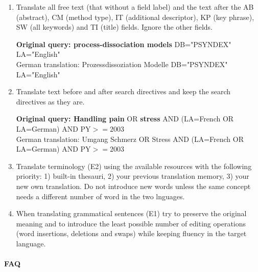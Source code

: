 \documentclass[a4paper,10pt]{article}
\newcommand{\ex}[1]{\begin{tcolorbox}[]{#1}\end{tcolorbox}}
\begin{document}
\begin{enumerate}

 \item Translate all free text (that without a field label) and the text after the AB (abstract), CM (method type), IT (additional descriptor), KP (key phrase), SW (all keywords) and TI (title) fields. Ignore the other fields.
 \ex{{\bf Original query: process-dissociation models} DB="PSYNDEX" LA="English" \\
     German translation: Prozessdissoziation Modelle DB="PSYNDEX" LA="English"}

 \item Translate text before and after search directives and keep the search directives as they are.
 \ex{{\bf Original query: Handling pain} OR {\bf stress} AND (LA=French OR LA=German) AND PY$>=2003$ \\
  German translation: Umgang Schmerz OR  Stress AND  (LA=French OR LA=German) AND PY$>=2003$}
  
 \item Translate terminology (E2) using the available resources with the following priority: 1) built-in thesauri, 2) your previous translation memory, 3) your new own translation. Do not introduce new words unless the same concept needs a different number of word in the two lnguages.

 \item When translating grammatical sentences (E1) try to preserve the original meaning and to introduce the least possible number of editing operations (word insertions, deletions and swaps) while keeping fluency in the target language. 

\end{enumerate}



\paragraph{FAQ}
\end{document}
